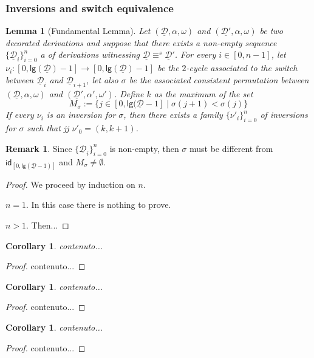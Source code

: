 \documentclass[a4paper]{article}
\newcommand{\id}[1]{\mathsf{id}_{#1}}
\newcommand{\dder}[1]{\mathscr{#1}}
\newcommand{\der}[1]{\underline{\dder{#1}}}
\newcommand{\lgh}[0]{\mathsf{lg}}
\newtheorem{lemma}[theorem]{Lemma}
\newtheorem{corollary}[theorem]{Corollary}
\theoremstyle{definition}
\newtheorem{remark}[theorem]{Remark}
\begin{document}
\subsubsection{Inversions and switch equivalence}

\begin{lemma}[Fundamental Lemma] Let $(\der{D}, \alpha, \omega)$ and $(\der{D'}, \alpha, \omega)$ be two decorated derivations and suppose that there exists a non-empty sequence $\{\der{D}_i\}_{i=0}^n$ a of derivations witnessing $\der{D}\equiv^s \der{D}'$. For every $i\in [0,n-1]$, let $\nu_i\colon [0, \lgh(\der{D})-1]\to [0, \lgh(\der{D})-1]$ be the $2$-cycle associated to the switch between $\der{D}_i$ and $\der{D}_{i+1}$, let also $\sigma$ be the associated consistent permutation between $(\der{D}, \alpha, \omega)$ and $(\der{D}', \alpha', \omega')$. Define $k$ as the maximum of the set
\[M_\sigma:=\{j\in [0, \lgh(\der{D}-1] \mid \sigma(j+1) < \sigma(j) \}\]
If every $\nu_i$ is an inversion for $\sigma$, then there exists a family $\{\nu'_i\}_{i=0}^n$ of inversions for $\sigma$ such that jj $\nu'_0=(k, k+1)$.
\end{lemma}
\begin{remark}
	Since $\{\der{D}_i\}_{i=0}^n$ is non-empty, then $\sigma$ must be different from $\id{[0, \lgh(\der{D}-1)]}$ and $M_{\sigma}\neq \emptyset$.
\end{remark}
\begin{proof}
	We proceed by induction on $n$.
	
	\smallskip\noindent $n=1$. In this case there is nothing to prove.
	
	\smallskip \noindent $n>1$. Then...
\end{proof}

\begin{corollary}
	contenuto...
\end{corollary}
\begin{proof}
	contenuto...
\end{proof}


\begin{corollary}
	contenuto...
\end{corollary}
\begin{proof}
	contenuto...
\end{proof}



\begin{corollary}
	contenuto...
\end{corollary}
\begin{proof}
	contenuto...
\end{proof}
\end{document}
